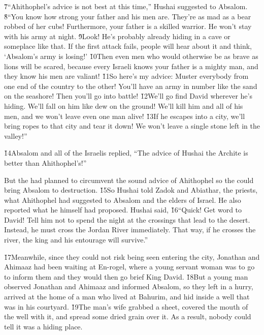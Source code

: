 \v{7}``Ahithophel's advice is not best at this time,'' Hushai suggested to Absalom. \v{8}``You know how strong your father and his men are. They're as mad as a bear robbed of her cubs! Furthermore, your father is a skilled warrior. He won't stay with his army at night. \v{9}Look! He's probably already hiding in a cave or someplace like that. If the first attack fails, people will hear about it and think, `Absalom's army is losing!' \v{10}Then even men who would otherwise be as brave as lions will be scared, because every Israeli knows your father is a mighty man, and they know his men are valiant! \v{11}So here's my advice: Muster everybody from one end of the country to the other! You'll have an army in number like the sand on the seashore! Then you'll go into battle! \v{12}We'll go find David wherever he's hiding. We'll fall on him like dew on the ground! We'll kill him and all of his men, and we won't leave even one man alive! \v{13}If he escapes into a city, we'll bring ropes to that city and tear it down! We won't leave a single stone left in the valley!''

\v{14}Absalom and all of the Israelis replied, ``The advice of Hushai the Archite is better than Ahithophel's!''

But the  had planned to circumvent the sound advice of Ahithophel so the  could bring Absalom to destruction. \v{15}So Hushai told Zadok and Abiathar, the priests, what Ahithophel had suggested to Absalom and the elders of Israel. He also reported what he himself had proposed. Hushai said, \v{16}``Quick! Get word to David! Tell him not to spend the night at the crossings that lead to the desert. Instead, he must cross the Jordan River immediately. That way, if he crosses the river, the king and his entourage will survive.''

\v{17}Meanwhile, since they could not risk being seen entering the city, Jonathan and Ahimaaz had been waiting at En-rogel, where a young servant woman was to go to inform them and they would then go brief King David. \v{18}But a young man observed Jonathan and Ahimaaz and informed Absalom, so they left in a hurry, arrived at the home of a man who lived at Bahurim, and hid inside a well that was in his courtyard. \v{19}The man's wife grabbed a sheet, covered the mouth of the well with it, and spread some dried grain over it. As a result, nobody could tell it was a hiding place.

